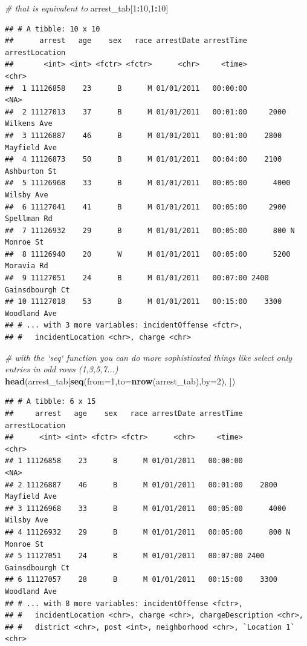 \documentclass[12pt,]{book}
\newenvironment{Shaded}{\begin{snugshade}}{\end{snugshade}}
\newcommand{\KeywordTok}[1]{\textcolor[rgb]{0.13,0.29,0.53}{\textbf{#1}}}
\newcommand{\DataTypeTok}[1]{\textcolor[rgb]{0.13,0.29,0.53}{#1}}
\newcommand{\DecValTok}[1]{\textcolor[rgb]{0.00,0.00,0.81}{#1}}
\newcommand{\CommentTok}[1]{\textcolor[rgb]{0.56,0.35,0.01}{\textit{#1}}}
\newcommand{\OperatorTok}[1]{\textcolor[rgb]{0.81,0.36,0.00}{\textbf{#1}}}
\newcommand{\NormalTok}[1]{#1}
\theoremstyle{definition}
\theoremstyle{definition}
\theoremstyle{remark}
\begin{document}
\begin{Shaded}
\begin{Highlighting}[]
\CommentTok{# that is equivalent to }
\NormalTok{arrest_tab[}\DecValTok{1}\OperatorTok{:}\DecValTok{10}\NormalTok{,}\DecValTok{1}\OperatorTok{:}\DecValTok{10}\NormalTok{]}
\end{Highlighting}
\end{Shaded}

\begin{verbatim}
## # A tibble: 10 x 10
##      arrest   age    sex   race arrestDate arrestTime       arrestLocation
##       <int> <int> <fctr> <fctr>      <chr>     <time>                <chr>
##  1 11126858    23      B      M 01/01/2011   00:00:00                 <NA>
##  2 11127013    37      B      M 01/01/2011   00:01:00     2000 Wilkens Ave
##  3 11126887    46      B      M 01/01/2011   00:01:00    2800 Mayfield Ave
##  4 11126873    50      B      M 01/01/2011   00:04:00    2100 Ashburton St
##  5 11126968    33      B      M 01/01/2011   00:05:00      4000 Wilsby Ave
##  6 11127041    41      B      M 01/01/2011   00:05:00     2900 Spellman Rd
##  7 11126932    29      B      M 01/01/2011   00:05:00      800 N Monroe St
##  8 11126940    20      W      M 01/01/2011   00:05:00      5200 Moravia Rd
##  9 11127051    24      B      M 01/01/2011   00:07:00 2400 Gainsdbourgh Ct
## 10 11127018    53      B      M 01/01/2011   00:15:00    3300 Woodland Ave
## # ... with 3 more variables: incidentOffense <fctr>,
## #   incidentLocation <chr>, charge <chr>
\end{verbatim}

\begin{Shaded}
\begin{Highlighting}[]
\CommentTok{# with the `seq` function you can do more sophisticated things like select only entries in odd rows (1,3,5,7...)}
\KeywordTok{head}\NormalTok{(arrest_tab[}\KeywordTok{seq}\NormalTok{(}\DataTypeTok{from=}\DecValTok{1}\NormalTok{,}\DataTypeTok{to=}\KeywordTok{nrow}\NormalTok{(arrest_tab),}\DataTypeTok{by=}\DecValTok{2}\NormalTok{), ])}
\end{Highlighting}
\end{Shaded}

\begin{verbatim}
## # A tibble: 6 x 15
##     arrest   age    sex   race arrestDate arrestTime       arrestLocation
##      <int> <int> <fctr> <fctr>      <chr>     <time>                <chr>
## 1 11126858    23      B      M 01/01/2011   00:00:00                 <NA>
## 2 11126887    46      B      M 01/01/2011   00:01:00    2800 Mayfield Ave
## 3 11126968    33      B      M 01/01/2011   00:05:00      4000 Wilsby Ave
## 4 11126932    29      B      M 01/01/2011   00:05:00      800 N Monroe St
## 5 11127051    24      B      M 01/01/2011   00:07:00 2400 Gainsdbourgh Ct
## 6 11127057    28      B      M 01/01/2011   00:15:00    3300 Woodland Ave
## # ... with 8 more variables: incidentOffense <fctr>,
## #   incidentLocation <chr>, charge <chr>, chargeDescription <chr>,
## #   district <chr>, post <int>, neighborhood <chr>, `Location 1` <chr>
\end{verbatim}
\end{document}
